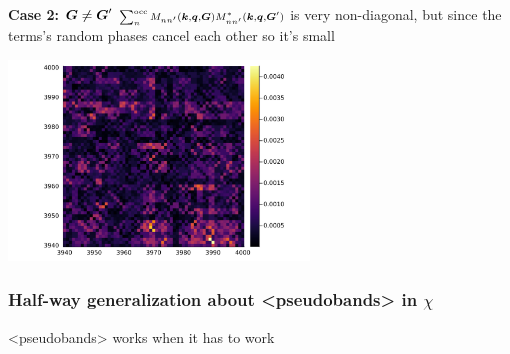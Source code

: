 \documentclass[t]{beamer}
\newcommand{\shortcode}[1]{\texttt{#1}}
\def\texttt#1{<#1>}%
\begin{document}
\begin{frame}[allowframebreaks]
\framebreak

\textbf{Case 2: $\vb*{G} \neq \vb*{G}'$} $\scriptstyle \sum_{n}^{\text{occ}} M_{n n'} (\vb*{k}, \vb*{q}, \vb*{G}) M^*_{nn'} (\vb*{k}, \vb*{q}, \vb*{G}')$ is very non-diagonal, 
but since the terms's random phases cancel each other so it's small

\begin{center}
    \includegraphics[width=0.6\textwidth]{../data/chi/nc_range-3939-4000-k_idx-2-q_idx-3-G1_idx-2000-G2_idx-2001.png}
\end{center}

\end{frame}

\begin{frame}
\frametitle{Half-way generalization about \shortcode{pseudobands} in $\chi$}

\faHandPointRight \shortcode{pseudobands} works  
when it has to work

\end{frame}
\end{document}
